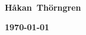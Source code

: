 \documentclass{book}
\begin{document}
\begin{titlepage}
    \colorbox{silver}{ \\
    }

    \vfill

    \hfill\mbox{\color{darkblue}\bfseries\sffamily\Large Håkan Thörngren}

    \hfill\mbox{\color{darkblue}\bfseries\sffamily\large \today}
\end{titlepage}

\tableofcontents
\listoftables



%
%
%
%
%
%
%
%
%
%
%
%
%
%
%
%
%
%
%
%
%
%
%
%
\end{document}
